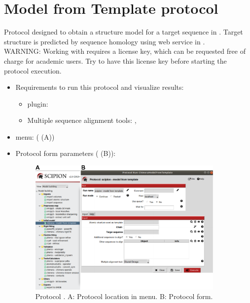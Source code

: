 \section{Model from Template protocol}
\label{app:modelFromTemplate}%
Protocol designed to obtain a structure model for a target sequence in \scipion. Target structure is predicted by sequence homology using \modeller \citep{sali1993} web service in \chimera.\\
WARNING: Working with \modeller requires a license key, which can be requested free of charge for academic users. Try to have this license key before starting the protocol execution. 

   
 \begin{itemize}
  \item Requirements to run this protocol and visualize results:
    \begin{itemize}
        \item \scipion plugin: 
        \item Multiple sequence alignment tools: , 
    \end{itemize}
  \item \scipion menu:
   ( (A))
  
  \item Protocol form parameters ( (B)):
  
  \begin{figure}[H]
    \centering 
    \captionsetup{width=.7\linewidth} 
    \includegraphics[width=0.90\textwidth]{Images_appendix/Fig111.pdf}
    \caption{Protocol . A: Protocol location in \scipion menu. B: Protocol form.}
    \label{fig:app_protocol_seqHomology_1}
   \end{figure}
  

\end{itemize}
